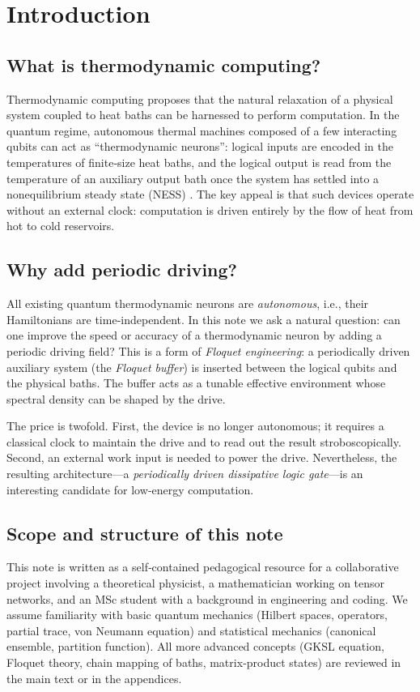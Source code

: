 \documentclass[11pt,a4paper]{article}
\theoremstyle{plain}
\theoremstyle{definition}
\theoremstyle{remark}
\begin{document}
\section{Introduction}
\subsection{What is thermodynamic computing?}
Thermodynamic computing \cite{Conte2019} proposes that the natural relaxation of a physical system coupled to heat baths can be harnessed to perform computation. In the quantum regime, autonomous thermal machines composed of a few interacting qubits can act as ``thermodynamic neurons'': logical inputs are encoded in the temperatures of finite‑size heat baths, and the logical output is read from the temperature of an auxiliary output bath once the system has settled into a nonequilibrium steady state (NESS) \cite{LipkaBartosik2024, Meier2025}. The key appeal is that such devices operate without an external clock: computation is driven entirely by the flow of heat from hot to cold reservoirs.

\subsection{Why add periodic driving?}
All existing quantum thermodynamic neurons are \emph{autonomous}, i.e., their Hamiltonians are time‑independent. In this note we ask a natural question: can one improve the speed or accuracy of a thermodynamic neuron by adding a periodic driving field? This is a form of \emph{Floquet engineering}: a periodically driven auxiliary system (the \emph{Floquet buffer}) is inserted between the logical qubits and the physical baths. The buffer acts as a tunable effective environment whose spectral density can be shaped by the drive.

The price is twofold. First, the device is no longer autonomous; it requires a classical clock to maintain the drive and to read out the result stroboscopically. Second, an external work input is needed to power the drive. Nevertheless, the resulting architecture---a \emph{periodically driven dissipative logic gate}---is an interesting candidate for low‑energy computation.

\subsection{Scope and structure of this note}
This note is written as a self‑contained pedagogical resource for a collaborative project involving a theoretical physicist, a mathematician working on tensor networks, and an MSc student with a background in engineering and coding. We assume familiarity with basic quantum mechanics (Hilbert spaces, operators, partial trace, von Neumann equation) and statistical mechanics (canonical ensemble, partition function). All more advanced concepts (GKSL equation, Floquet theory, chain mapping of baths, matrix‑product states) are reviewed in the main text or in the appendices.
\end{document}
